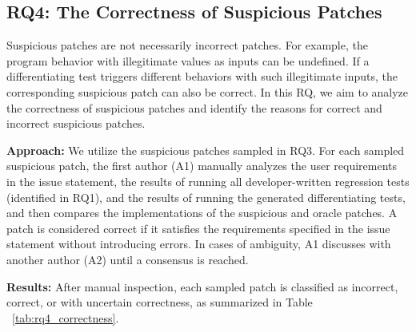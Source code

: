 \subsection{RQ4: The Correctness of Suspicious Patches}

Suspicious patches are not necessarily incorrect patches.
For example, the program behavior with illegitimate values as inputs can be undefined.
If a differentiating test triggers different behaviors with such illegitimate inputs, the corresponding suspicious patch can also be correct.
In this RQ, we aim to analyze the correctness of suspicious patches and identify the reasons for correct and incorrect suspicious patches.

\noindent \textbf{Approach:}
We utilize the suspicious patches sampled in RQ3.
For each sampled suspicious patch, the first author (A1) manually analyzes the user requirements in the issue statement, the results of running all developer-written regression tests (identified in RQ1), and the results of running the generated differentiating tests, and then compares the implementations of the suspicious and oracle patches.
A patch is considered correct if it satisfies the requirements specified in the issue statement without introducing errors.
In cases of ambiguity, A1 discusses with another author (A2) until a consensus is reached.




\noindent \textbf{Results:}
After manual inspection, each sampled patch is classified as incorrect, correct, or with uncertain correctness, as summarized in Table ~\ref{tab:rq4_correctness}.

